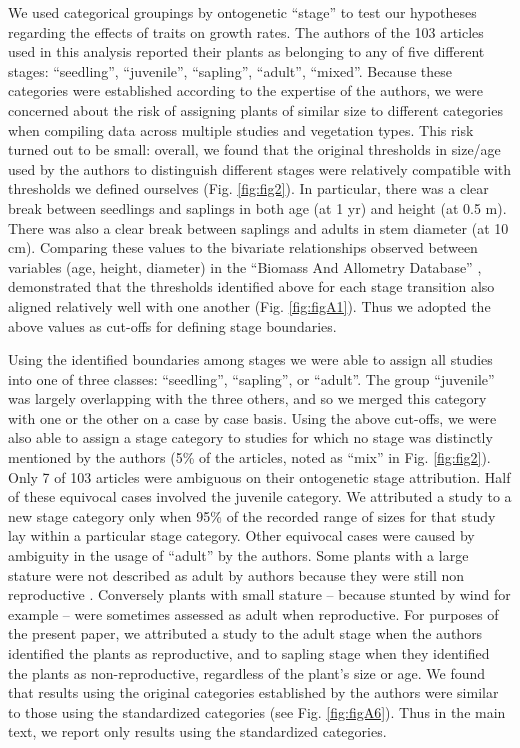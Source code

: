 \documentclass[a4paper,11pt]{article}
\begin{document}
We used categorical groupings by ontogenetic ``stage'' to test our hypotheses regarding the effects of traits on growth rates. The authors of the 103 articles used in this analysis reported their plants as belonging to any of five different stages: ``seedling'', ``juvenile'', ``sapling'', ``adult'', ``mixed''. Because these categories were established according to the expertise of the authors, we were concerned about the risk of assigning plants of similar size to different categories when compiling data across multiple studies and vegetation types. This risk turned out to be small: overall, we found that the original thresholds in size/age used by the authors to distinguish different stages were relatively compatible with thresholds we defined ourselves (Fig. \ref{fig:fig2}). In particular, there was a clear break between seedlings and saplings in both age (at 1 yr) and height (at 0.5 m). There was also a clear break between saplings and adults in stem diameter (at 10 cm). Comparing these values to the bivariate relationships observed between variables (age, height, diameter) in the ``Biomass And Allometry Database'' \citep{Falster:2015}, demonstrated that the thresholds identified above for each stage transition also aligned relatively well with one another (Fig. \ref{fig:figA1}). Thus we adopted the above values as cut-offs for defining stage boundaries.

Using the identified boundaries among stages we were able to assign all studies into one of three classes: ``seedling'', ``sapling'', or ``adult''. The group ``juvenile'' was largely overlapping with the three others, and so we merged this category with one or the other on a case by case basis. Using the above cut-offs, we were also able to assign a stage category to studies for which no stage was distinctly mentioned by the authors (5\% of the articles, noted as ``mix'' in Fig. \ref{fig:fig2}). Only 7 of 103 articles were ambiguous on their ontogenetic stage attribution. Half of these equivocal cases involved the juvenile category. We attributed a study to a new stage category only when 95\% of the recorded range of sizes for that study lay within a particular stage category. Other equivocal cases were caused by ambiguity in the usage of ``adult'' by the authors. Some plants with a large stature were not described as adult by authors because they were still non reproductive \citep{King:2006he}. Conversely plants with small stature -- because stunted by wind for example \citep{Stratton:2001ck} -- were sometimes assessed as adult when reproductive. For purposes of the present paper, we attributed a study to the adult stage when the authors identified the plants as reproductive, and to sapling stage when they identified the plants as non-reproductive, regardless of the plant's size or age. We found that results using the original categories established by the authors were similar to those using the standardized categories (see Fig. \ref{fig:figA6}). Thus in the main text, we report only results using the standardized categories.
\end{document}
